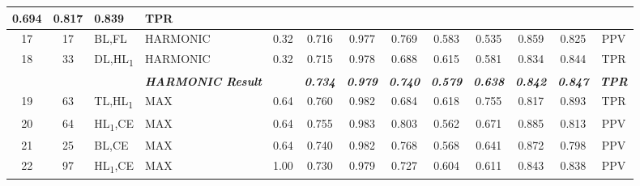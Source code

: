 \begin{table}[H]
{\begin{tabular}{ccl|l|c|c|c|c|c|c|c|c|c|}
    0.694 &
    0.817 &
    0.839 &
    TPR \\ \hline
  \multicolumn{1}{|c|}{17} &
    \multicolumn{1}{c|}{17} &
    BL,FL &
    HARMONIC &
    0.32 &
    0.716 &
    0.977 &
    0.769 &
    0.583 &
    0.535 &
    0.859 &
    0.825 &
    PPV \\ \hline
  \multicolumn{1}{|c|}{18} &
    \multicolumn{1}{c|}{33} &
    DL,HL\textsubscript{1} &
    HARMONIC &
    0.32 &
    0.715 &
    0.978 &
    0.688 &
    0.615 &
    0.581 &
    0.834 &
    0.844 &
    TPR \\ \hline
   &
    \textit{\textbf{}} &
     &
    \textit{\textbf{HARMONIC Result}} &
     &
    \textit{\textbf{0.734}} &
    \textit{\textbf{0.979}} &
    \textit{\textbf{0.740}} &
    \textit{\textbf{0.579}} &
    \textit{\textbf{0.638}} &
    \textit{\textbf{0.842}} &
    \textit{\textbf{0.847}} &
    \textit{\textbf{TPR}} \\ \hline
    \multicolumn{1}{|c|}{19} &
    \multicolumn{1}{c|}{63} &
    TL,HL\textsubscript{1} &
    MAX &
    0.64 &
    0.760 &
    0.982 &
    0.684 &
    0.618 &
    0.755 &
    0.817 &
    0.893 &
    TPR \\ \hline
  \multicolumn{1}{|c|}{20} &
    \multicolumn{1}{c|}{64} &
    HL\textsubscript{1},CE &
    MAX &
    0.64 &
    0.755 &
    0.983 &
    0.803 &
    0.562 &
    0.671 &
    0.885 &
    0.813 &
    PPV \\ \hline
  \multicolumn{1}{|c|}{21} &
    \multicolumn{1}{c|}{25} &
    BL,CE &
    MAX &
    0.64 &
    0.740 &
    0.982 &
    0.768 &
    0.568 &
    0.641 &
    0.872 &
    0.798 &
    PPV \\ \hline
  \multicolumn{1}{|c|}{22} &
    \multicolumn{1}{c|}{97} &
    HL\textsubscript{1},CE &
    MAX &
    1.00 &
    0.730 &
    0.979 &
    0.727 &
    0.604 &
    0.611 &
    0.843 &
    0.838 &
    PPV \\ \hline


\end{tabular}}
\end{table}
